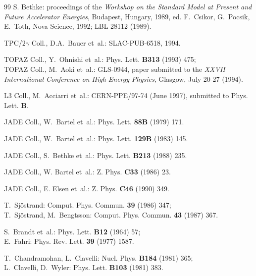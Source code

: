 \documentclass[12pt,a4paper,twoside]{article}
\begin{document}
\begin{thebibliography}{99}
S. Bethke:                          proceedings of the {\it Workshop
                                    on the Standard Model at Present 
                                    and Future Accelerator Energies}, 
                                    Budapest, Hungary, 1989,
                                    ed. F.~Csikor, G.~Pocsik, E.~Toth, 
                                    Nova Science, 1992;
                                    LBL-28112 (1989).

TPC/$2\gamma$ Coll., D.A.~Bauer et~al.:
                                    SLAC-PUB-6518, 1994.

TOPAZ Coll., Y.~Ohnishi et~al.:     Phys. Lett. {\bf B313} (1993) 475;\\
TOPAZ Coll., M.~Aoki et~al.:        GLS-0944, paper submitted to the 
                                    {\em XXVII International Conference on High
                                         Energy Physics}, 
                                    Glasgow, July 20-27 (1994).

L3 Coll., M.~Acciarri et~al.:       CERN-PPE/97-74 (June 1997), 
                                    submitted to Phys. Lett. {\bf B}.

JADE Coll., W.~Bartel et~al.:       Phys. Lett. {\bf 88B} (1979) 171.

JADE Coll., W.~Bartel et~al.:       Phys. Lett. {\bf 129B} (1983) 145.

JADE Coll., S.~Bethke et~al.:       Phys. Lett. {\bf B213} (1988) 235.

JADE Coll., W. Bartel et~al.:        Z. Phys. {\bf C33} (1986) 23.

JADE Coll., E. Elsen et~al.:        Z. Phys. {\bf C46} (1990) 349.

T.~Sj\"ostrand:                     Comput. Phys. Commun. {\bf 39} (1986) 347;\\
T.~Sj\"ostrand, M.~Bengtsson:       Comput. Phys. Commun. {\bf 43} (1987) 367.

S.~Brandt et~al.:                   Phys. Lett. {\bf B12} (1964) 57;\\
E.~Fahri:                           Phys. Rev. Lett. {\bf 39} (1977) 1587.

T.~Chandramohan, L.~Clavelli:       Nucl. Phys. {\bf B184} (1981) 365;\\
L.~Clavelli, D.~Wyler:              Phys. Lett. {\bf B103} (1981) 383.


\end{thebibliography}
\end{document}
